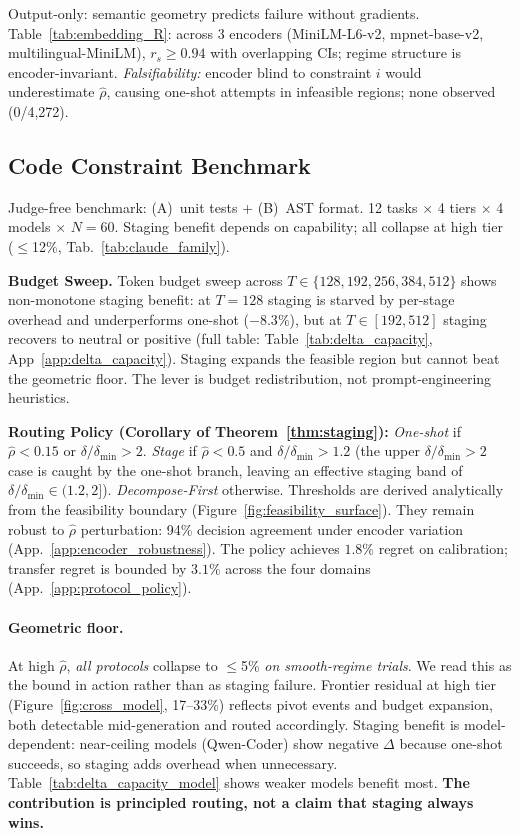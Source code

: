 \documentclass{article}
\theoremstyle{plain}
\theoremstyle{definition}
\theoremstyle{remark}
\newcommand{\rhohat}{\hat{\rho}}
\newcommand{\appref}[1]{App.~\ref{#1}}
\begin{document}
Output-only: semantic geometry predicts failure without gradients. Table~\ref{tab:embedding_R}: across 3 encoders (MiniLM-L6-v2, mpnet-base-v2, multilingual-MiniLM), $r_s \geq 0.94$ with overlapping CIs; regime structure is encoder-invariant. \emph{Falsifiability:} encoder blind to constraint $i$ would underestimate $\rhohat$, causing one-shot attempts in infeasible regions; none observed (0/4{,}272).

\subsection{Code Constraint Benchmark}\label{sec:llm_bridge}

Judge-free benchmark: (A)~unit tests + (B)~AST format. 12 tasks $\times$ 4 tiers $\times$ 4 models $\times$ $N{=}60$. Staging benefit depends on capability; all collapse at high tier ($\leq$12\%, Tab.~\ref{tab:claude_family}).

\textbf{Budget Sweep.}
Token budget sweep across $T \in \{128, 192, 256, 384, 512\}$ shows non-monotone staging benefit: at $T{=}128$ staging is starved by per-stage overhead and underperforms one-shot ($-8.3\%$), but at $T \in [192, 512]$ staging recovers to neutral or positive (full table: Table~\ref{tab:delta_capacity}, App~\ref{app:delta_capacity}). Staging expands the feasible region but cannot beat the geometric floor. The lever is budget redistribution, not prompt-engineering heuristics.

\noindent\textbf{Routing Policy (Corollary of Theorem~\ref{thm:staging}):} \emph{One-shot} if $\rhohat < 0.15$ or $\delta/\delta_{\min} > 2$. \emph{Stage} if $\rhohat < 0.5$ and $\delta/\delta_{\min} > 1.2$ (the upper $\delta/\delta_{\min} > 2$ case is caught by the one-shot branch, leaving an effective staging band of $\delta/\delta_{\min} \in (1.2, 2]$). \emph{Decompose-First} otherwise. Thresholds are derived analytically from the feasibility boundary (Figure~\ref{fig:feasibility_surface}). They remain robust to $\rhohat$ perturbation: 94\% decision agreement under encoder variation (\appref{app:encoder_robustness}). The policy achieves $1.8\%$ regret on calibration; transfer regret is bounded by $3.1\%$ across the four domains (\appref{app:protocol_policy}).

\paragraph{Geometric floor.}
At high $\rhohat$, \emph{all protocols} collapse to $\leq$5\% \emph{on smooth-regime trials}. We read this as the bound in action rather than as staging failure. Frontier residual at high tier (Figure~\ref{fig:cross_model}, 17--33\%) reflects pivot events and budget expansion, both detectable mid-generation and routed accordingly. Staging benefit is model-dependent: near-ceiling models (Qwen-Coder) show negative $\Delta$ because one-shot succeeds, so staging adds overhead when unnecessary. Table~\ref{tab:delta_capacity_model} shows weaker models benefit most. \textbf{The contribution is principled routing, not a claim that staging always wins.}
\end{document}

